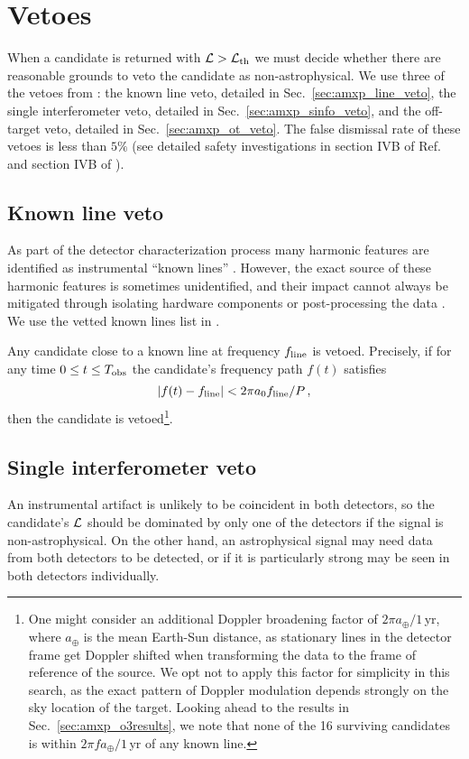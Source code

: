 \section{Vetoes \label{sec:amxp_vetoes}} 
When a candidate is returned with $\mathcal{L} > \mathcal{L}_{\rm th}$ we must decide whether there are reasonable grounds to veto the candidate as non-astrophysical. We use three of the vetoes from \citet{Middleton2020}: the known line veto, detailed in Sec.~\ref{sec:amxp_line_veto}, the single interferometer veto, detailed in Sec.~\ref{sec:amxp_sinfo_veto}, and the off-target veto, detailed in Sec.~\ref{sec:amxp_ot_veto}. The false dismissal rate of these vetoes is less than $5\%$ (see detailed safety investigations in section IVB of Ref. \cite{o1vitsco} and section IVB of \citet{o2vitsco}).

\subsection{Known line veto \label{sec:amxp_line_veto}}
As part of the detector characterization process many harmonic features are identified as instrumental ``known lines'' \cite{o12lines, o23DetChar}. However, the exact source of these harmonic features is sometimes unidentified, and their impact cannot always be mitigated through isolating hardware components or post-processing the data \cite{o12lines, o23DetChar}. We use the vetted known lines list in \citet{o3lineslist}.

Any candidate close to a known line at frequency $f_{\rm line}$ is vetoed. Precisely, if for any time $0 \leq t \leq T_{\rm obs}$ the candidate's frequency path $f(t)$ satisfies 
\begin{equation}
{|f(t) - f_{\rm line}| < 2\pi a_0 f_{\rm line} / P \,,}
\end{equation}
then the candidate is vetoed\footnote{One might consider an additional Doppler broadening factor of $2\pi a_\oplus/1\,$yr, where $a_\oplus$ is the mean Earth-Sun distance, as stationary lines in the detector frame get Doppler shifted when transforming the data to the frame of reference of the source. We opt not to apply this factor for simplicity in this search, as the exact pattern of Doppler modulation depends strongly on the sky location of the target. Looking ahead to the results in Sec.~\ref{sec:amxp_o3results}, we note that none of the 16 surviving candidates is within $2 \pi f a_\oplus/1\,$yr of any known line.}. 

\subsection{Single interferometer veto \label{sec:amxp_sinfo_veto}}
An instrumental artifact is unlikely to be coincident in both detectors, so the candidate's $\mathcal{L}$ should be dominated by only one of the detectors if the signal is non-astrophysical. On the other hand, an astrophysical signal may need data from both detectors to be detected, or if it is particularly strong may be seen in both detectors individually. 

